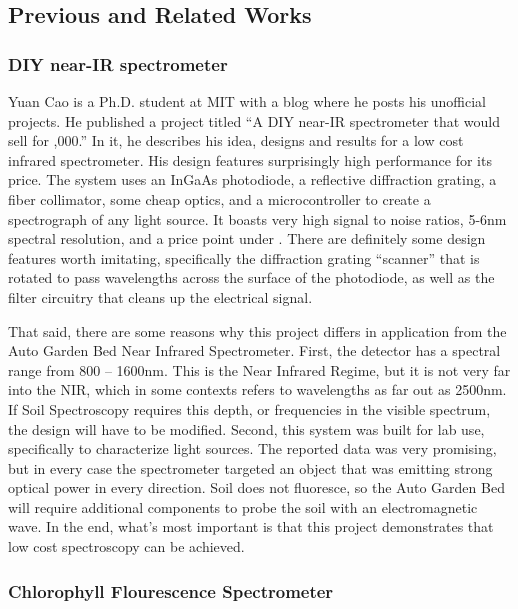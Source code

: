 \subsection{Previous and Related Works}

\subsubsection{DIY near-IR spectrometer}

Yuan Cao is a Ph.D. student at MIT with a blog where he posts his unofficial projects. He published a project titled “A  DIY near-IR spectrometer that would sell for ,000.” In it, he describes his idea, designs and results for a low cost infrared spectrometer. His design features surprisingly high performance for its price. The system uses an InGaAs photodiode, a reflective diffraction grating, a fiber collimator, some cheap optics, and a microcontroller to create a spectrograph of any light source. It boasts very high signal to noise ratios, 5-6nm spectral resolution, and a price point under . There are definitely some design features worth imitating, specifically the diffraction grating “scanner” that is rotated to pass wavelengths across the surface of the photodiode, as well as the filter circuitry that cleans up the electrical signal. 

That said, there are some reasons why this project differs in application from the Auto Garden Bed Near Infrared Spectrometer. First, the detector has a spectral range from 800 – 1600nm. This is the Near Infrared Regime, but it is not very far into the NIR, which in some contexts refers to wavelengths as far out as 2500nm. If Soil Spectroscopy requires this depth, or frequencies in the visible spectrum, the design will have to be modified. Second, this system was built for lab use, specifically to characterize light sources. The reported data was very promising, but in every case the spectrometer targeted an object that was emitting strong optical power in every direction. Soil does not fluoresce, so the Auto Garden Bed will require additional components to probe the soil with an electromagnetic wave. In the end, what’s most important is that this project demonstrates that low cost spectroscopy can be achieved.


\subsubsection{Chlorophyll Flourescence Spectrometer}

